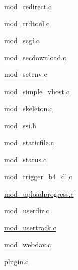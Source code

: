 \begin{DoxyCompactItemize}
\hyperlink{mod__redirect_8c}{mod\-\_\-redirect.\-c}\item 
\hyperlink{mod__rrdtool_8c}{mod\-\_\-rrdtool.\-c}\item 
\hyperlink{mod__scgi_8c}{mod\-\_\-scgi.\-c}\item 
\hyperlink{mod__secdownload_8c}{mod\-\_\-secdownload.\-c}\item 
\hyperlink{mod__setenv_8c}{mod\-\_\-setenv.\-c}\item 
\hyperlink{mod__simple__vhost_8c}{mod\-\_\-simple\-\_\-vhost.\-c}\item 
\hyperlink{mod__skeleton_8c}{mod\-\_\-skeleton.\-c}\item 
\hyperlink{mod__ssi_8h}{mod\-\_\-ssi.\-h}\item 
\hyperlink{mod__staticfile_8c}{mod\-\_\-staticfile.\-c}\item 
\hyperlink{mod__status_8c}{mod\-\_\-status.\-c}\item 
\hyperlink{mod__trigger__b4__dl_8c}{mod\-\_\-trigger\-\_\-b4\-\_\-dl.\-c}\item 
\hyperlink{mod__uploadprogress_8c}{mod\-\_\-uploadprogress.\-c}\item 
\hyperlink{mod__userdir_8c}{mod\-\_\-userdir.\-c}\item 
\hyperlink{mod__usertrack_8c}{mod\-\_\-usertrack.\-c}\item 
\hyperlink{mod__webdav_8c}{mod\-\_\-webdav.\-c}\item 
\hyperlink{plugin_8c}{plugin.\-c}\end{DoxyCompactItemize}
